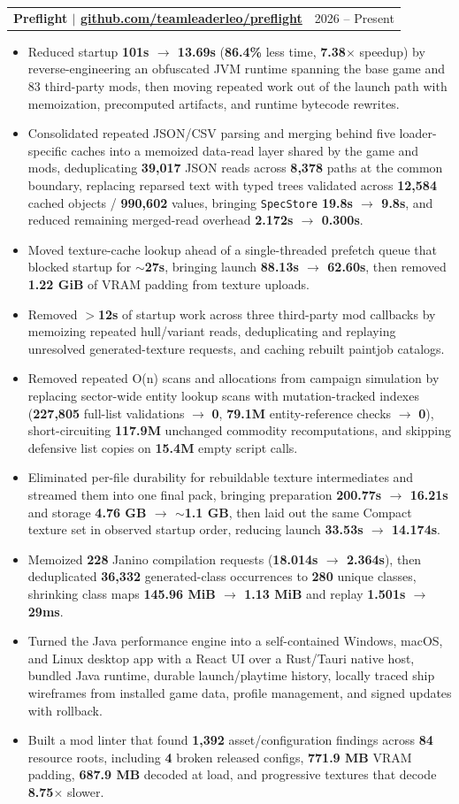 \documentclass[letterpaper,11pt]{article}
\makeatletter
\newcommand{\resumeHeadingSimple}[2]{%
  \begin{tabularx}{\textwidth}{@{}Xr@{}}
    \textbf{#1} & #2
  \end{tabularx}\vspace{-1pt}
}
\newcommand{\resumeItemListStart}{\begin{itemize}[leftmargin=0.23in,itemsep=0.4pt,parsep=0pt,topsep=0.5pt]}
\newcommand{\resumeItem}[1]{\item\fontsize{9.9pt}{11.1pt}\selectfont #1}
\newcommand{\resumeItemListEnd}{\end{itemize}\vspace{-1.25pt}}
\makeatother
\begin{document}
\resumeHeadingSimple
  {Preflight $|$ \href{https://github.com/teamleaderleo/preflight}{github.com/teamleaderleo/preflight}}
  {2026 -- Present}
\resumeItemListStart
  \resumeItem{Reduced startup \textbf{101s $\rightarrow$ 13.69s} (\textbf{86.4\%} less time, \textbf{7.38$\times$} speedup) by reverse-engineering an obfuscated JVM runtime spanning the base game and 83 third-party mods, then moving repeated work out of the launch path with memoization, precomputed artifacts, and runtime bytecode rewrites.}
  \resumeItem{Consolidated repeated JSON/CSV parsing and merging behind five loader-specific caches into a memoized data-read layer shared by the game and mods, deduplicating \textbf{39,017} JSON reads across \textbf{8,378} paths at the common boundary, replacing reparsed text with typed trees validated across \textbf{12,584} cached objects / \textbf{990,602} values, bringing \texttt{SpecStore} \textbf{19.8s $\rightarrow$ 9.8s}, and reduced remaining merged-read overhead \textbf{2.172s $\rightarrow$ 0.300s}.}
  \resumeItem{Moved texture-cache lookup ahead of a single-threaded prefetch queue that blocked startup for \textbf{$\sim$27s}, bringing launch \textbf{88.13s $\rightarrow$ 62.60s}, then removed \textbf{1.22 GiB} of VRAM padding from texture uploads.}
  \resumeItem{Removed \textbf{$>$12s} of startup work across three third-party mod callbacks by memoizing repeated hull/variant reads, deduplicating and replaying unresolved generated-texture requests, and caching rebuilt paintjob catalogs.}
  \resumeItem{Removed repeated O(n) scans and allocations from campaign simulation by replacing sector-wide entity lookup scans with mutation-tracked indexes (\textbf{227,805} full-list validations $\rightarrow$ \textbf{0}, \textbf{79.1M} entity-reference checks $\rightarrow$ \textbf{0}), short-circuiting \textbf{117.9M} unchanged commodity recomputations, and skipping defensive list copies on \textbf{15.4M} empty script calls.}
  \resumeItem{Eliminated per-file durability for rebuildable texture intermediates and streamed them into one final pack, bringing preparation \textbf{200.77s $\rightarrow$ 16.21s} and storage \textbf{4.76 GB $\rightarrow$ $\sim$1.1 GB}, then laid out the same Compact texture set in observed startup order, reducing launch \textbf{33.53s $\rightarrow$ 14.174s}.}
  \resumeItem{Memoized \textbf{228} Janino compilation requests (\textbf{18.014s $\rightarrow$ 2.364s}), then deduplicated \textbf{36,332} generated-class occurrences to \textbf{280} unique classes, shrinking class maps \textbf{145.96 MiB $\rightarrow$ 1.13 MiB} and replay \textbf{1.501s $\rightarrow$ 29ms}.}
  \resumeItem{Turned the Java performance engine into a self-contained Windows, macOS, and Linux desktop app with a React UI over a Rust/Tauri native host, bundled Java runtime, durable launch/playtime history, locally traced ship wireframes from installed game data, profile management, and signed updates with rollback.}
  \resumeItem{Built a mod linter that found \textbf{1,392} asset/configuration findings across \textbf{84} resource roots, including \textbf{4} broken released configs, \textbf{771.9 MB} VRAM padding, \textbf{687.9 MB} decoded at load, and progressive textures that decode \textbf{8.75$\times$} slower.}
\resumeItemListEnd
\end{document}
